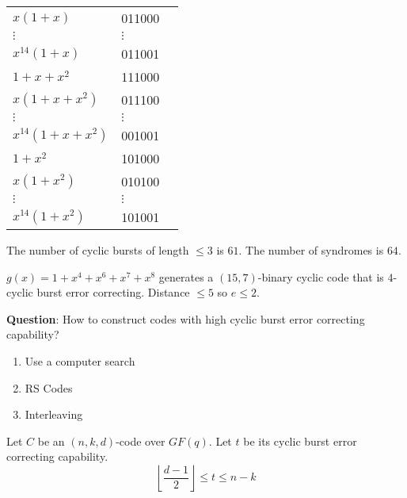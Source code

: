 \begin{table}[H]
\begin{tabularx}{\linewidth}{@{}YYY@{}}
        $ x(1+x) $          & 011000                                               \\
        $ \vdots $          & $ \vdots $                                           \\
        $ x^{14}(1+x) $     & 011001                                               \\
        \midrule
        $ 1+x+x^2 $         & 111000                                               \\
        $ x(1+x+x^2) $      & 011100                                               \\
        $ \vdots $          & $ \vdots $                                           \\
        $ x^{14}(1+x+x^2) $ & 001001                                               \\
        \midrule
        $ 1+x^2 $           & 101000                                               \\
        $ x(1+x^2) $        & 010100                                               \\
        $ \vdots $          & $ \vdots $                                           \\
        $ x^{14}(1+x^2) $   & 101001                                               \\
    \end{tabularx}
\end{table}
The number of cyclic bursts of length $ \leqslant 3 $ is $ 61 $.
The number of syndromes is $ 64 $.

\begin{exbox}
    \begin{example}
        $ g(x)=1+x^4+x^6+x^7+x^8 $ generates a $ (15,7) $-binary cyclic
        code that is $ 4 $-cyclic burst error correcting.
        Distance $ \leqslant 5 $ so $ e\leqslant 2 $.
    \end{example}
\end{exbox}

\textbf{Question}: How to construct codes with high cyclic burst error
correcting capability?
\begin{enumerate}[label=(\arabic*)]
    \item Use a computer search
    \item RS Codes
    \item Interleaving
\end{enumerate}

\begin{thmbox}
    \begin{theorem}
        Let $ C $ be an $ (n,k,d) $-code over $ GF(q) $. Let $ t $ be its
        cyclic burst error correcting capability.
        \[ \left\lfloor \frac{d-1}{2} \right\rfloor \leqslant t \leqslant n-k \]
    \end{theorem}
\end{thmbox}

